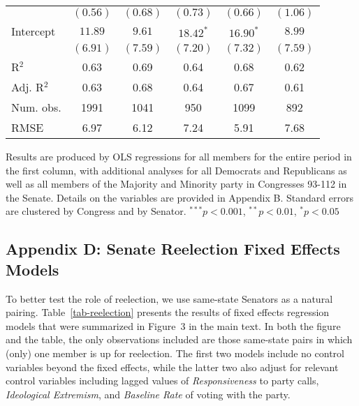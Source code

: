\documentclass[12pt]{article}
\begin{document}
\begin{table}[H]
\begin{threeparttable}
\begin{tabular}{l c c c c c }
                      & $(0.56)$      & $(0.68)$     & $(0.73)$       & $(0.66)$     & $(1.06)$     \\
Intercept             & $11.89$       & $9.61$       & $18.42^{*}$    & $16.90^{*}$  & $8.99$       \\
                      & $(6.91)$      & $(7.59)$     & $(7.20)$       & $(7.32)$     & $(7.59)$     \\
\hline
R$^2$                 & 0.63          & 0.69         & 0.64           & 0.68         & 0.62         \\
Adj. R$^2$            & 0.63          & 0.68         & 0.64           & 0.67         & 0.61         \\
Num. obs.             & 1991          & 1041         & 950            & 1099         & 892          \\
RMSE                  & 6.97          & 6.12         & 7.24           & 5.91         & 7.68         \\
\hline
\end{tabular}
\begin{tablenotes}
   \item
   Results are produced by OLS regressions for all members for the entire period in the first column, with additional analyses for all Democrats and Republicans as well as all members of the Majority and Minority party in Congresses 93-112 in the Senate. Details on the variables are provided in Appendix B.
   Standard errors are clustered by Congress and by Senator.
$^{***}p<0.001$, $^{**}p<0.01$, $^*p<0.05$
 \end{tablenotes}
\end{threeparttable}
\end{table}


\subsection*{Appendix D: Senate Reelection Fixed Effects Models}
%

To better test the role of reelection, we use same-state Senators as a natural pairing.
Table~\ref{tab-reelection} presents the results of fixed effects regression models that were summarized in Figure~3 in the main text.
In both the figure and the table, the only observations included are those
same-state pairs in which (only) one member is up for reelection.
The first two models include no control variables beyond the fixed effects, while the latter two also adjust for relevant control variables including lagged values of \textit{Responsiveness} to party calls, \textit{Ideological Extremism}, and \textit{Baseline Rate} of voting with the party.
\end{document}

